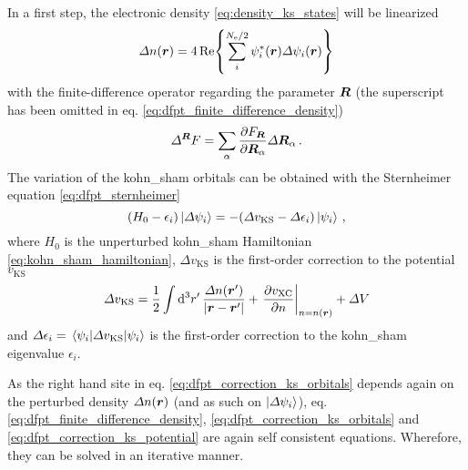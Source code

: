 \documentclass[main.tex]{subfiles}
\begin{document}
In a first step, the electronic density \ref{eq:density_ks_states} will be linearized
\begin{equation}\label{eq:dfpt_finite_difference_density}
    \Delta n(\vb*{r}) = 4 \Re{\sum_i^{N_{\mathrm{e}} / 2} \psi_i^* (\vb*{r}) \Delta \psi_i (\vb*{r})}
\end{equation}
with the finite-difference operator regarding the parameter \(\vb*{R}\) (the superscript has been omitted in eq. \ref{eq:dfpt_finite_difference_density})
\begin{equation}
    \Delta^{\vb*{R}} F = \sum_{\alpha} \pdv{F_{\vb*{R}}}{\vb*{R}_{\alpha}} \Delta \vb*{R}_{\alpha}\,.
\end{equation}
The variation of the \acrshort{kohn_sham} orbitals can be obtained with the Sternheimer equation \ref{eq:dfpt_sternheimer}
\begin{equation}\label{eq:dfpt_correction_ks_orbitals}
    (H_0 - \epsilon_i) \ket{\Delta \psi_i} = - (\Delta v_{\mathrm{KS}} - \Delta \epsilon_i) \ket{\psi_i}\,,
\end{equation}
where \(H_0\) is the unperturbed \acrshort{kohn_sham} Hamiltonian \ref{eq:kohn_sham_hamiltonian}, \(\Delta v_{\mathrm{KS}}\) is the first-order correction to the potential \(v_{\mathrm{KS}}\)
\begin{equation}\label{eq:dfpt_correction_ks_potential}
    \Delta v_{\mathrm{KS}} = \frac{1}{2} \int \dd[3]{r^{\prime}} \frac{\Delta n(\vb*{r}^{\prime})}{\vert \vb*{r} - \vb*{r}^{\prime} \vert} + \left. \pdv{v_{\mathrm{XC}}}{n} \right\vert_{n = n(\vb*{r})} + \Delta V
\end{equation}
and \(\Delta \epsilon_i = \expval{\Delta v_{\mathrm{KS}}}{\psi_i}\) is the first-order correction to the \acrshort{kohn_sham} eigenvalue \(\epsilon_i\).

As the right hand site in eq. \ref{eq:dfpt_correction_ks_orbitals} depends again on the perturbed density \(\Delta n(\vb*{r})\) (and as such on \(\ket{\Delta \psi_i}\)), eq. \ref{eq:dfpt_finite_difference_density}, \ref{eq:dfpt_correction_ks_orbitals} and \ref{eq:dfpt_correction_ks_potential} are again self consistent equations. Wherefore, they can be solved in an iterative manner.
\end{document}
